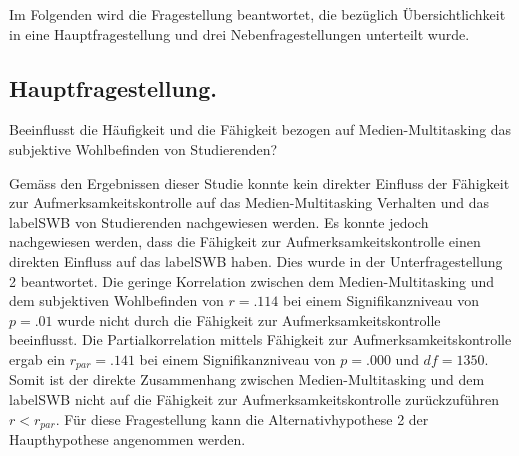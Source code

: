 %
%
\glsresetall
\let\raggedsection\centering
{}
\setcounter{chapter}{4}
\setcounter{section}{0}
\let\raggedsection\raggedright 

\label{section.diskussion.fragestellung}
Im Folgenden wird die Fragestellung beantwortet, die bezüglich Übersichtlichkeit in eine Hauptfragestellung und drei Nebenfragestellungen unterteilt wurde. 
\par
\subsection{Hauptfragestellung.} Beeinflusst die Häufigkeit und die Fähigkeit bezogen auf Medien-Multitasking das subjektive Wohlbefinden von Studierenden?
\par
Gemäss den Ergebnissen dieser Studie konnte kein direkter Einfluss der Fähigkeit zur Aufmerksamkeitskontrolle auf das Medien-Multitasking Verhalten und das \gls{labelSWB} von Studierenden nachgewiesen werden. Es konnte jedoch nachgewiesen werden, dass die Fähigkeit zur Aufmerksamkeitskontrolle einen direkten Einfluss auf das \gls{labelSWB} haben. Dies wurde in der Unterfragestellung 2 beantwortet. Die geringe Korrelation zwischen dem Medien-Multitasking und dem subjektiven Wohlbefinden von $r=.114$ bei einem Signifikanzniveau von $p=.01$ wurde nicht durch die Fähigkeit zur Aufmerksamkeitskontrolle beeinflusst. Die Partialkorrelation mittels Fähigkeit zur Aufmerksamkeitskontrolle ergab ein $r_{par}=.141$ bei einem Signifikanzniveau von $p=.000$ und $df=1350$. Somit ist der direkte Zusammenhang zwischen Medien-Multitasking und dem \gls{labelSWB} nicht auf die Fähigkeit zur Aufmerksamkeitskontrolle zurückzuführen $r<r_{par}$. Für diese Fragestellung kann die Alternativhypothese 2 der Haupthypothese angenommen werden.

